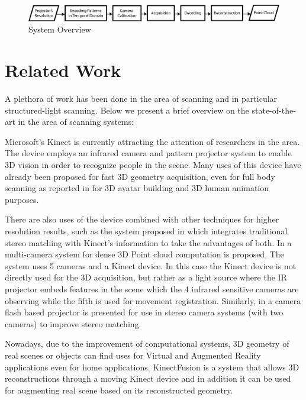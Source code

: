\documentclass[final,12pt,3p]{elsarticle}
\begin{document}
\begin{figure}[!ht]
 \centering
 \includegraphics[scale=0.5]{./systemOverview.png}
 \caption{\label{fig:system_overview} System Overview}
\end{figure}

\section{Related Work}
\label{sec:related_work}
A plethora of work has been done in the area of scanning and in particular structured-light scanning. Below we present a brief overview on the state-of-the-art in the area of scanning systems:

Microsoft's Kinect\cite{smisek20133d} is currently attracting the attention of researchers in the area. The device employs an infrared camera and pattern projector system to enable 3D vision in order to recognize people in the scene. Many uses of this device have already been proposed for fast 3D geometry acquisition, even for full body scanning as reported in \cite{cui20113d} \cite{tong2012scanning} for 3D avatar building and 3D human animation purposes. 

There are also uses of the device combined with other techniques for higher resolution results, such as the system proposed in \cite{somanath2013stereo+} which integrates traditional stereo matching with Kinect's information to take the advantages of both.
In \cite{fritsch2012photogrammetric} a multi-camera system for dense 3D Point cloud computation is proposed. The system uses 5 cameras and a Kinect device. In this case the Kinect device is not directly used for the 3D acquisition, but rather as a light source where the IR projector embeds features in the scene which the 4 infrared sensitive cameras are observing while the fifth is used for movement registration. Similarly, in \cite{rohith2009camera} a camera flash based projector is presented for use in stereo camera systems (with two cameras) to improve stereo matching.

Nowadays, due to the improvement of computational systems, 3D geometry of real scenes or objects can find uses for Virtual and Augmented Reality applications even for home applications. KinectFusion \cite{izadi2011kinectfusion} is a system that allows 3D reconstructions through a moving Kinect device and in addition it can be used for augmenting real scene based on its reconstructed geometry.
\end{document}
